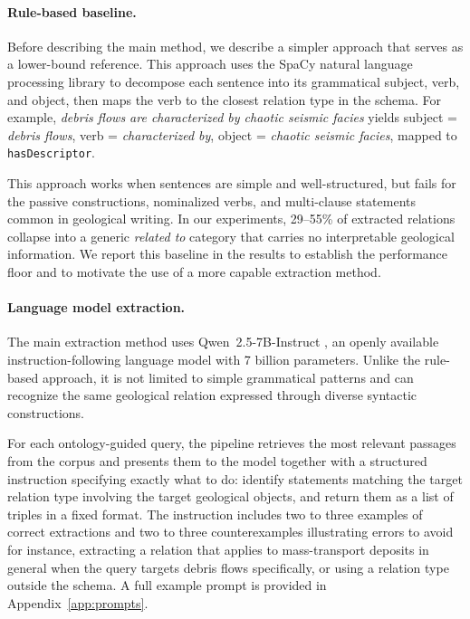\documentclass[10pt]{article}
\newcommand{\pred}[1]{\texttt{\small #1}}
\begin{document}
\paragraph{Rule-based baseline.}
Before describing the main method, we describe a simpler
approach that serves as a lower-bound reference.
This approach uses the SpaCy natural language processing
library \citep{honnibal2020spacy} to decompose each sentence
into its grammatical subject, verb, and object, then maps
the verb to the closest relation type in the schema.
For example, \emph{debris flows are characterized by chaotic
seismic facies} yields subject = \emph{debris flows},
verb = \emph{characterized by}, object = \emph{chaotic
seismic facies}, mapped to \pred{hasDescriptor}.

This approach works when sentences are simple and
well-structured, but fails for the passive constructions,
nominalized verbs, and multi-clause statements common in
geological writing.
In our experiments, 29--55\% of extracted relations collapse
into a generic \emph{related to} category that carries no
interpretable geological information.
We report this baseline in the results to establish the
performance floor and to motivate the use of a more capable
extraction method.

\paragraph{Language model extraction.}
The main extraction method uses Qwen~2.5-7B-Instruct
\citep{yang2024qwen2technicalreport}, an openly available
instruction-following language model with 7 billion
parameters.
Unlike the rule-based approach, it is not limited to simple
grammatical patterns and can recognize the same geological
relation expressed through diverse syntactic constructions.

For each ontology-guided query, the pipeline retrieves
the most relevant passages from the corpus and presents them
to the model together with a structured instruction specifying
exactly what to do: identify statements matching the target
relation type involving the target geological objects, and
return them as a list of triples in a fixed format.
The instruction includes two to three examples of correct
extractions and two to three counterexamples illustrating
errors to avoid  for instance, extracting a relation that
applies to mass-transport deposits in general when the query
targets debris flows specifically, or using a relation type
outside the schema.
A full example prompt is provided in
Appendix~\ref{app:prompts}.
\end{document}
